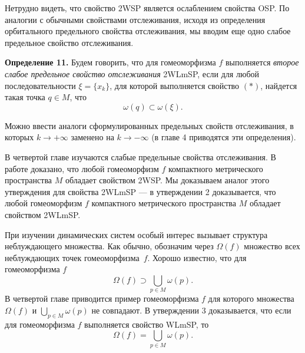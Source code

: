 \documentclass[12pt]{article}
\begin{document}
Нетрудно видеть, что свойство 2WSP является ослаблением свойства OSP.
По аналогии с обычными свойствами отслеживания, исходя из определения орбитального предельного свойства отслеживания, мы вводим еще одно слабое предельное свойство отслеживания.
 
 \textbf{Определение 11.}
  Будем говорить, что для гомеоморфизма $f$ выполняется \textit{второе слабое предельное свойс\-тво отслеживания} 2WLmSP, если для любой последовательности $\xi\!=\!\{x_k\}$, для которой выполняется свойство $(*)$, найдется такая точка $q\in\! M$, что 
\begin{equation}
\label{0.1}
\omega(q)\subset\omega(\xi).
\end{equation}

Можно ввести аналоги сформулированных предельных свойств отслеживания, в которых $k\rightarrow+\infty$ заменено на $k\rightarrow-\infty$ (в главе 4 приводятся эти определения).

В четвертой главе изучаются слабые предельные свойства отслеживания. 
В работе \cite{3} доказано, что любой гомеоморфизм $f$ компактного метрического пространства $M$ обладает свойством 2WSP. Мы доказываем аналог этого утверждения для свойства 2WLmSP ---
в утверждении 2 доказывается, что любой гомеоморфизм $f$ компактного метрического пространства $M$ обладает свойством 2WLmSP. %

 При изучении динамических систем особый интерес вызывает структура неблуждающего множества. Как обычно, обозначим через $\Omega(f)$ множество всех неблуждающих точек гомеоморфизма~$f$.
Хорошо известно, что для гомеоморфизма $f$
$$\Omega(f)\supset \bigcup_{p\in M}\omega(p).$$
В четвертой главе приводится пример гомеоморфизма $f$ для которого множества $\Omega(f)$ и $\bigcup_{p\in M}\omega(p)$ не совпадают. В утверждении 3 доказывается, что если для гомеоморфизма $f$ выполняется свойство WLmSP, то
$$\Omega(f)= \bigcup_{p\in M}\omega(p).$$
\end{document}

